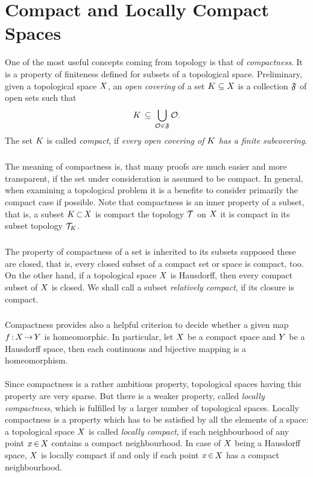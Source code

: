\documentclass[11pt,twoside]{article}
\begin{document}
\section{Compact and Locally Compact Spaces}                                   %
One of the most useful concepts coming from topology
is that of \textit{compactness}.
It is a property of finiteness defined for subsets of a topological space.
Preliminary,
given a topological space $X$,
an \textit{open covering} of a set ${K} \subseteq X$
is a collection $\mathfrak{F}$ of open sets such that
\[
{K} \, \subseteq \, \bigcup_{\mathcal{O} \in {\mathfrak{F}}} \mathcal{O}.
\]
The set ${K}$ is called \textit{compact},
if \textit{every open covering of ${K}$ has a finite subcovering}.

\subparagraph{}
The meaning of compactness is,
that many proofs are much easier and more transparent,
if the set under consideration is assumed to be compact.
In general,
when examining a topological problem
it is a benefite to consider primarily the compact case if possible.
Note that compactness is an {inner property} of a subset,
that is,
a subset ${K} {\,\subset\,} X$ is compact
{\wrt} the topology $\mathcal{T}$ on $X$
\iff it is compact in its subset topology $\mathcal{T}_{{K}}$.

\subparagraph{} %
The property of compactness of a set is inherited to its subsets
supposed these are closed,
that is,
every closed subset of a compact set or space is compact,
too.
On the other hand,
if a topological space $X$ is Hausdorff,
then every compact subset of $X$ is closed.
We shall call a subset \textit{relatively compact},
if its closure is compact.

\subparagraph{} %
Compactness provides also a helpful criterion to decide
whether a given map $f {\,:\,} X {\,\to\,} Y$ is homeomorphic.
In particular,
let $X$ be a compact space and $Y$ be a Hausdorff space,
then each continuous and bijective mapping is a homeomorphism.

\paragraph{} %
Since compactness is a rather ambitious property,
topological spaces having this property are very sparse.
But there is a weaker property,
called \textit{locally compactness},
which is fulfilled by a larger number of topological spaces.
Locally compactness is a property
which has to be satisfied by all the elements of a space:
a topological space $X$ is called \textit{locally compact},
if each neighbourhood of any point $x {\,\in\,} X$
contains a compact neighbourhood.
In case of $X$ being a Hausdorff space, $X$ is locally compact if
and only if each point $x {\,\in\,} X$ has a compact neighbourhood.
\end{document}

